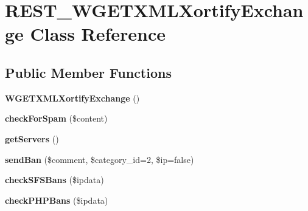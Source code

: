 \hypertarget{class_r_e_s_t___w_g_e_t_x_m_l_xortify_exchange}{\section{R\-E\-S\-T\-\_\-\-W\-G\-E\-T\-X\-M\-L\-Xortify\-Exchange Class Reference}
\label{class_r_e_s_t___w_g_e_t_x_m_l_xortify_exchange}
}
\subsection*{Public Member Functions}
\begin{DoxyCompactItemize}
\item 
\hypertarget{class_r_e_s_t___w_g_e_t_x_m_l_xortify_exchange_a7d7e5d1092a075a86ff1edb6bd5a4171}{{\bfseries W\-G\-E\-T\-X\-M\-L\-Xortify\-Exchange} ()}\label{class_r_e_s_t___w_g_e_t_x_m_l_xortify_exchange_a7d7e5d1092a075a86ff1edb6bd5a4171}

\item 
\hypertarget{class_r_e_s_t___w_g_e_t_x_m_l_xortify_exchange_a7a4f53c3841dc7806455261af557d514}{{\bfseries check\-For\-Spam} (\$content)}\label{class_r_e_s_t___w_g_e_t_x_m_l_xortify_exchange_a7a4f53c3841dc7806455261af557d514}

\item 
\hypertarget{class_r_e_s_t___w_g_e_t_x_m_l_xortify_exchange_a882f365bc81e207dc2123ef707735e82}{{\bfseries get\-Servers} ()}\label{class_r_e_s_t___w_g_e_t_x_m_l_xortify_exchange_a882f365bc81e207dc2123ef707735e82}

\item 
\hypertarget{class_r_e_s_t___w_g_e_t_x_m_l_xortify_exchange_a0293acfa4afe0cb5b2816352a35d8ca7}{{\bfseries send\-Ban} (\$comment, \$category\-\_\-id=2, \$ip=false)}\label{class_r_e_s_t___w_g_e_t_x_m_l_xortify_exchange_a0293acfa4afe0cb5b2816352a35d8ca7}

\item 
\hypertarget{class_r_e_s_t___w_g_e_t_x_m_l_xortify_exchange_a985a563a84e3e5c54694fcce192bda53}{{\bfseries check\-S\-F\-S\-Bans} (\$ipdata)}\label{class_r_e_s_t___w_g_e_t_x_m_l_xortify_exchange_a985a563a84e3e5c54694fcce192bda53}

\item 
\hypertarget{class_r_e_s_t___w_g_e_t_x_m_l_xortify_exchange_aeb1bf9aaee4718870adbd07333490aaf}{{\bfseries check\-P\-H\-P\-Bans} (\$ipdata)}\label{class_r_e_s_t___w_g_e_t_x_m_l_xortify_exchange_aeb1bf9aaee4718870adbd07333490aaf}


\end{DoxyCompactItemize}
